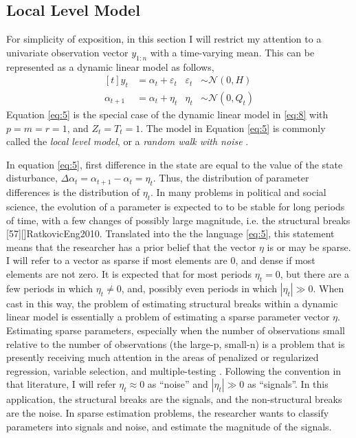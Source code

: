 \documentclass{article}
\newcommand{\dist}[1]{\mathcal{#1}}
\newcommand{\paren}[1]{\ensuremath{\left(#1\right)}}
\newcommand{\dnorm}[1]{\ensuremath{\dist{N}\paren{#1}}}
\begin{document}
\subsection{Local Level Model}
\label{sec:local-level-model}

For simplicity of exposition, in this section I will restrict my attention to a univariate observation vector $y_{1:n}$ with a time-varying mean.
This can be represented as a dynamic linear model as follows,
\begin{equation}
  \label{eq:5}
  \begin{aligned}[t]
    y_{t} &= \alpha_{t} + \varepsilon_{t} & \varepsilon_{t} & \sim \dnorm{0, H} \\
    \alpha_{t + 1} &= \alpha_{t} + \eta_{t} & \eta_{t} & \sim \dnorm{0, Q_{t}}
  \end{aligned}
\end{equation}
Equation \eqref{eq:5} is the special case of the dynamic linear model in \eqref{eq:8} with $p = m = r = 1$, and $Z_{t} = T_{t} = 1$.
The model in Equation \eqref{eq:5} is commonly called the \textit{local level model}, or a \textit{random walk with noise} \parencites[Chapter 2][]{DurbinKoopman2001}[Chapter 2][]{WestHarrison1997}.

In equation \eqref{eq:5}, first difference in the state are equal to the value of the state disturbance, $\Delta \alpha_{t} = \alpha_{t+1} - \alpha_{t} = \eta_{t}$.
Thus, the distribution of parameter differences is the distribution of $\eta_{t}$.
In many problems in political and social science, the evolution of a parameter is expected to to be stable for long periods of time, with a few changes of possibly large magnitude, i.e. the structural breaks \parencite{Pierson2004}[57][]{RatkovicEng2010}.
Translated into the the language \eqref{eq:5}, this statement means that the researcher has a prior belief that the vector $\eta$ is or may be sparse.
I will refer to a vector as sparse if most elements are 0, and dense if most elements are not zero.
It is expected that for most periods $\eta_{t} = 0$, but there are a few periods in which $\eta_{t} \neq 0$, and, possibly even periods in which $|\eta_{t}| \gg 0$.
When cast in this way, the problem of estimating structural breaks within a dynamic linear model is essentially a problem of estimating a sparse parameter vector $\eta$.
Estimating sparse parameters, especially when the number of observations small relative to the number of observations (the large-p, small-n) is a problem that is presently receiving much attention in the areas of penalized or regularized regression, variable selection, and multiple-testing \parencite{CarvalhoPolsonScott2010}.
Following the convention in that literature, I will refer $\eta_{t} \approx 0$ as ``noise'' and $|\eta_{t}| \gg 0$ as ``signals''.
In this application, the structural breaks are the signals, and the non-structural breaks are the noise.
In sparse estimation problems, the researcher wants to classify parameters into signals and noise, and estimate the magnitude of the signals.
\end{document}
